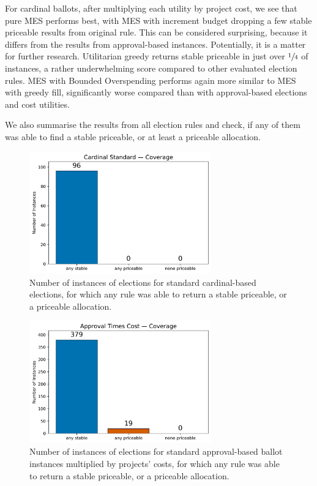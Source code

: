 For cardinal ballots, after multiplying each utility by project cost, we see that pure MES performs best, with MES with increment budget dropping a few stable priceable results from original rule. This can be considered surprising, because it differs from the results from approval-based instances. Potentially, it is a matter for further research. Utilitarian greedy returns stable priceable in just over $\sfrac{1}{4}$ of instances, a rather underwhelming score compared to other evaluated election rules. MES with Bounded Overspending performs again more similar to MES with greedy fill, significantly worse compared than with approval-based elections and cost utilities.

We also summarise the results from all election rules and check, if any of them was able to find a stable priceable, or at least a priceable allocation.
\begin{figure}[H]         
  \centering              
  \includegraphics[width=0.7\textwidth]{figures/plots/cardinal-standard/cardinal_standard_coverage_non_exhaustive.png}
  \caption{Number of instances of elections for standard cardinal-based elections, for which any rule was able to return a stable priceable, or a priceable allocation.}
  \label{fig:myplot}
\end{figure}
\begin{figure}[H]         
  \centering              
  \includegraphics[width=0.7\textwidth]{figures/plots/approval-times-cost/approval_times_cost_coverage_non_exhaustive.png}
  \caption{Number of instances of elections for standard approval-based ballot instances multiplied by projects' costs, for which any rule was able to return a stable priceable, or a priceable allocation.}
  \label{fig:myplot}
\end{figure}
